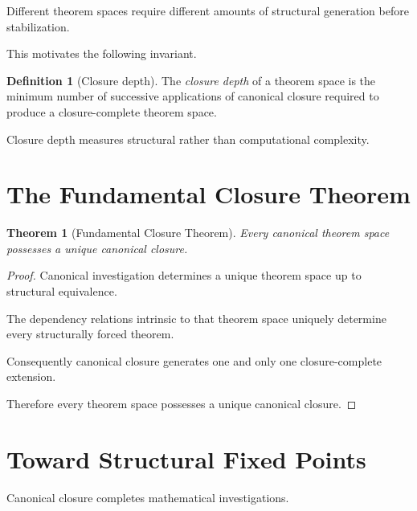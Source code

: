 \documentclass[13pt,openany]{book}
\theoremstyle{plain}
\newtheorem{theorem}{Theorem}[chapter]
\theoremstyle{definition}
\newtheorem{definition}{Definition}[chapter]
\begin{document}
Different theorem spaces require different amounts of structural generation
before stabilization.

This motivates the following invariant.

\begin{definition}[Closure depth]

The \emph{closure depth} of a theorem space is the minimum number of successive
applications of canonical closure required to produce a closure-complete
theorem space.

\end{definition}

Closure depth measures structural rather than computational complexity.

\section{The Fundamental Closure Theorem}

\begin{theorem}[Fundamental Closure Theorem]

Every canonical theorem space possesses a unique canonical closure.

\end{theorem}

\begin{proof}

Canonical investigation determines a unique theorem space up to structural
equivalence.

The dependency relations intrinsic to that theorem space uniquely determine
every structurally forced theorem.

Consequently canonical closure generates one and only one closure-complete
extension.

Therefore every theorem space possesses a unique canonical closure.

\end{proof}

\section{Toward Structural Fixed Points}

Canonical closure completes mathematical investigations.
\end{document}
